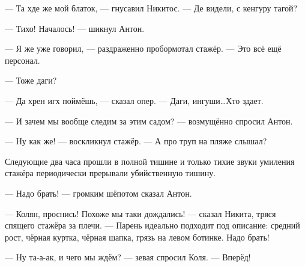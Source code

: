 --- Та хде же мой блаток, --- гнусавил Никитос. --- Де видели, с кенгуру тагой?

--- Тихо! Началось! --- шикнул Антон.

--- Я же уже говорил, --- раздраженно пробормотал стажёр. --- Это всё ещё персонал.

--- Тоже даги?

--- Да хрен игх поймёшь, --- сказал опер. --- Даги, ингуши\ldots Хто здает.

--- И зачем мы вообще следим за этим садом? --- возмущённо спросил Антон.

--- Ну как же! --- воскликнул стажёр. --- А про труп на пляже слышал?

Следующие два часа прошли в полной тишине и только тихие звуки умиления стажёра периодически прерывали убийственную тишину. 

\asterisks

--- Надо брать! --- громким шёпотом сказал Антон.

--- Колян, проснись! Похоже мы таки дождались! --- сказал Никита, тряся спящего стажёра за плечи. --- Парень идеально подходит под описание: средний рост, чёрная куртка, чёрная шапка, грязь на левом ботинке. Надо брать!

--- Ну та-а-ак, и чего мы ждём? --- зевая спросил Коля. --- Вперёд!

\pagebreak

